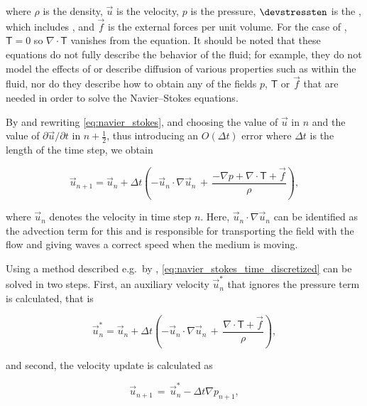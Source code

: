 where $\rho$ is the density, $\vec{u}$ is the velocity, $p$ is the pressure, $\devstressten$ is the , which includes , and $\vec{f}$ is the external forces per unit volume. For the case of , ${\boldsymbol{\mathsf{T}} = 0}$ so ${\nabla\cdot\boldsymbol{\mathsf{T}}}$ vanishes from the equation. It should be noted that these equations do not fully describe the behavior of the fluid; for example, they do not model the effects of  or describe diffusion of various properties such as \temperature within the fluid, nor do they describe how to obtain any of the fields $p$, $\boldsymbol{\mathsf{T}}$ or $\vec{f}$ that are needed in order to solve the Navier--Stokes equations.

By  and rewriting \eqref{eq:navier_stokes}, and choosing the value of $\vec{u}$ in \timestep $n$ and the value of $\partial\vec{u}/\partial t$ in \timestep $n+\frac{1}{2}$, thus introducing an $O(\Delta t)$ error where $\Delta t$ is the length of the time step, we obtain

\begin{equation} \label{eq:navier_stokes_time_discretized}
\vec{u}_{n+1}  = \vec{u}_{n} + \Delta t\left(-\vec{u}_{n}\cdot\nabla\vec{u}_{n} \,+\, \frac{-\nabla p + \nabla\cdot\boldsymbol{\mathsf{T}} + \vec{f}}{\rho}\right),
\end{equation}

where $\vec{u}_{n}$ denotes the velocity in time step $n$. Here, $\vec{u}_{n}\cdot\nabla\vec{u}_{n}$ can be identified as the advection term for this \PDE and is responsible for transporting the field with the flow and giving waves a correct speed when the medium is moving.

Using a method described e.g.\ by \citet{Losasso2004}, \eqref{eq:navier_stokes_time_discretized} can be solved in two steps. First, an auxiliary velocity $\vec{u}^*_n$ that ignores the pressure term is calculated, that is

\begin{equation} \label{eq:auxiliary_velocity}
\vec{u}^*_n  = \vec{u}_{n} + \Delta t\left(-\vec{u}_{n}\cdot\nabla\vec{u}_{n} \,+\, \frac{\nabla\cdot\boldsymbol{\mathsf{T}} + \vec{f}}{\rho}\right),
\end{equation}

and second, the velocity update is calculated as

\begin{equation} \label{eq:velocity_update}
\vec{u}_{n+1} \,=\, \vec{u}^*_n - \Delta t\nabla p_{n+1},
\end{equation}

